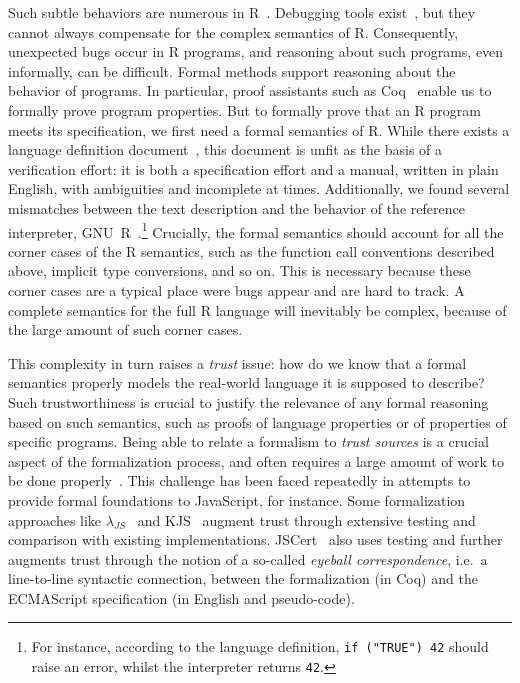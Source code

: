 \documentclass[
    sigplan,
    10pt,
    review, %
    natbib=false %
 ]{acmart}
\newcommand\newtext[1]{{\color{blue} #1}}
\begin{document}
Such subtle behaviors are numerous in R~\parencite{RInferno}.
Debugging tools exist~\parencite{mcpherson2014},
but they cannot always compensate for the complex semantics of R.
Consequently, unexpected bugs occur in R programs,
and reasoning about such programs, even informally, can be difficult.
%
\newtext{Formal methods support reasoning about the behavior of programs. In particular, proof assistants such as Coq~\parencite{Coq} enable us
to formally prove program properties.}
But to formally prove that an R program meets its specification,
we first need a formal semantics of R.
While there exists a language definition document~\parencite{team2000r}, this document is unfit as the basis of a verification effort:
it is both a specification effort and a manual, written in plain English, with ambiguities and incomplete at times.
Additionally, we found several mismatches between the text description and the behavior of the reference interpreter, GNU~R~\parencite{Rwebsite}.\footnote{For instance, according to the language definition, \texttt{if ("TRUE") 42} should raise an error, whilst the interpreter returns \texttt{42}.}
Crucially, the formal semantics should account for all the corner cases of the R semantics, such as the function call conventions described above, implicit type conversions, and so on.
This is necessary because these corner cases are a typical place were bugs appear and are hard to track.
A complete semantics for the full R language will inevitably be complex,
because of the large amount of such corner cases.

\newtext{This complexity in turn raises a {\em trust} issue: 
how do we know that a formal semantics properly models the real-world language it is supposed to describe? Such trustworthiness is crucial to justify the relevance of any formal reasoning based on such semantics, such as proofs of language properties or of properties of specific programs.} Being able to relate a formalism to {\em trust sources} is a crucial aspect of the formalization process, and often requires a large amount of work to be done properly~\parencite{leroy2014pip}. This challenge has been faced repeatedly in attempts to provide formal foundations to JavaScript, for instance.
%
Some formalization approaches like $\lambda_{JS}$~\cite{Guha2010} and KJS~\cite{kjs} augment trust through extensive testing and comparison with existing implementations. JSCert~\parencite{popl14jscert} also uses testing and further augments trust through the notion of a so-called {\em eyeball correspondence}, i.e.~a line-to-line syntactic connection, between the formalization (in Coq) and the ECMAScript specification (in English and pseudo-code).
\end{document}

